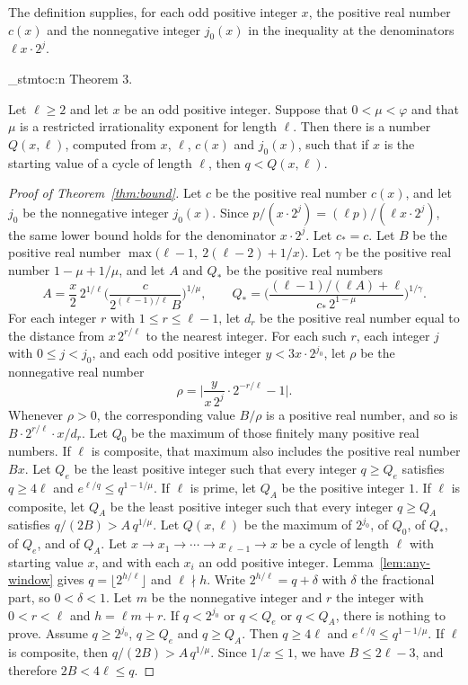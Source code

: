\documentclass[11pt]{article}
\newenvironment{named}[1]{%
  \par\addvspace{\medskipamount}%
  \pagebreak[3]%
  \noindent{\bfseries #1}\space\ignorespaces
  \stmtoc{#1}%
}{\par\addvspace{\medskipamount}}
\newcommand{\stmtoc}[1]{ \qn_stmtoc:n {#1} }
\newcounter{stmtref}
\newcommand{\markstmt}[2]{%
  \setcounter{stmtref}{#1}%
  \addtocounter{stmtref}{-1}%
  \refstepcounter{stmtref}%
  \label{#2}%
}
\begin{document}
The definition supplies, for each odd positive integer $x$, the positive real number $c(x)$ and the nonnegative integer $j_0(x)$ in the inequality at the denominators $\ell x \cdot 2^j$.

\begin{named}{Theorem 3.}
\markstmt{3}{thm:bound}
Let $\ell \ge 2$ and let $x$ be an odd positive integer.
Suppose that $0 < \mu < \varphi$ and that $\mu$ is a restricted irrationality exponent for length $\ell$.
Then there is a number $Q(x, \ell)$, computed from $x$, $\ell$, $c(x)$ and $j_0(x)$, such that if $x$ is the starting value of a cycle of length $\ell$, then $q < Q(x, \ell)$.
\end{named}

\begin{proof}[Proof of Theorem~\ref{thm:bound}]
Let $c$ be the positive real number $c(x)$, and let $j_0$ be the nonnegative integer $j_0(x)$.
Since $p/(x \cdot 2^j) = (\ell p)/(\ell x \cdot 2^j)$, the same lower bound holds for the denominator $x \cdot 2^j$.
Let $c_* = c$.
Let $B$ be the positive real number $\max\bigl(\ell-1,\ 2(\ell-2) + 1/x\bigr)$.
Let $\gamma$ be the positive real number $1 - \mu + 1/\mu$, and let $A$ and $Q_*$ be the positive real numbers
\[
A = \frac{x}{2}\, 2^{1/\ell}
\Biggl( \frac{c}{2^{(\ell-1)/\ell}\, B} \Biggr)^{1/\mu},
\qquad
Q_* = \Biggl( \frac{(\ell-1)/(\ell A) + \ell}{c_*\, 2^{1-\mu}} \Biggr)^{1/\gamma}.
\]
For each integer $r$ with $1 \le r \le \ell - 1$, let $d_r$ be the positive real number equal to the distance from $x\, 2^{r/\ell}$ to the nearest integer.
For each such $r$, each integer $j$ with $0 \le j < j_0$, and each odd positive integer $y < 3x \cdot 2^{j_0}$, let $\rho$ be the nonnegative real number
\[
\rho = \Biggl| \frac{y}{x\, 2^{j}} \cdot 2^{-r/\ell} - 1 \Biggr|.
\]
Whenever $\rho > 0$, the corresponding value $B/\rho$ is a positive real number, and so is $B \cdot 2^{r/\ell} \cdot x / d_r$.
Let $Q_0$ be the maximum of those finitely many positive real numbers.
If $\ell$ is composite, that maximum also includes the positive real number $Bx$.
Let $Q_e$ be the least positive integer such that every integer $q \ge Q_e$ satisfies $q \ge 4\ell$ and $e^{\ell/q} \le q^{1-1/\mu}$.
If $\ell$ is prime, let $Q_A$ be the positive integer $1$.
If $\ell$ is composite, let $Q_A$ be the least positive integer such that every integer $q \ge Q_A$ satisfies $q/(2B) > A\, q^{1/\mu}$.
Let $Q(x, \ell)$ be the maximum of $2^{j_0}$, of $Q_0$, of $Q_*$, of $Q_e$, and of $Q_A$.
Let $x \to x_1 \to \cdots \to x_{\ell-1} \to x$ be a cycle of length $\ell$ with starting value $x$, and with each $x_i$ an odd positive integer.
Lemma~\ref{lem:any-window} gives $q = \lfloor 2^{h/\ell} \rfloor$ and $\ell \nmid h$.
Write $2^{h/\ell} = q + \delta$ with $\delta$ the fractional part, so $0 < \delta < 1$.
Let $m$ be the nonnegative integer and $r$ the integer with $0 < r < \ell$ and $h = \ell m + r$.
If $q < 2^{j_0}$ or $q < Q_e$ or $q < Q_A$, there is nothing to prove.
Assume $q \ge 2^{j_0}$, $q \ge Q_e$ and $q \ge Q_A$.
Then $q \ge 4\ell$ and $e^{\ell/q} \le q^{1-1/\mu}$.
If $\ell$ is composite, then $q/(2B) > A\, q^{1/\mu}$.
Since $1/x \le 1$, we have $B \le 2\ell - 3$, and therefore $2B < 4\ell \le q$.


\end{proof}
\end{document}
